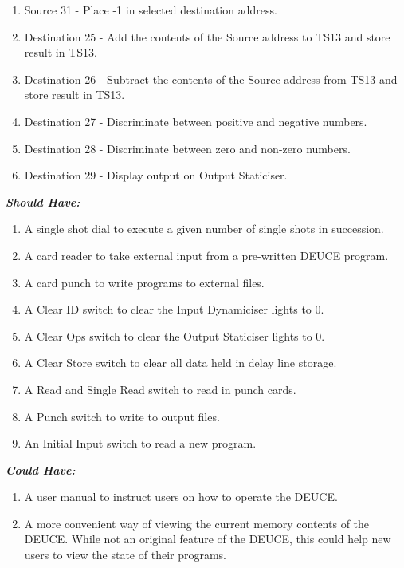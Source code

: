 \documentclass{l4proj}
\begin{document}
\begin{enumerate}
\begin{enumerate}
		\item Source 31 - Place -1 in selected destination address.
		\item Destination 25 - Add the contents of the Source address to TS13 and store result in TS13.
		\item Destination 26 - Subtract the contents of the Source address from TS13 and store result in TS13.
		\item Destination 27 - Discriminate between positive and negative numbers.
		\item Destination 28 - Discriminate between zero and non-zero numbers.
		\item Destination 29 - Display output on Output Staticiser.
		
	\end{enumerate}
\end{enumerate}

\textbf{\textit{Should Have:}}
\begin{enumerate}
	\item A single shot dial to execute a given number of single shots in succession.
	\item A card reader to take external input from a pre-written DEUCE program.
	\item A card punch to write programs to external files.
	\item A Clear ID switch to clear the Input Dynamiciser lights to 0.
	\item A Clear Ops switch to clear the Output Staticiser lights to 0.
	\item A Clear Store switch to clear all data held in delay line storage.
	\item A Read and Single Read switch to read in punch cards.
	\item A Punch switch to write to output files.
	\item An Initial Input switch to read a new program.
	
\end{enumerate}

\textbf{\textit{Could Have:}}
\begin{enumerate}
	\item A user manual to instruct users on how to operate the DEUCE.
	\item A more convenient way of viewing the current memory contents of the DEUCE. While not an original feature of the DEUCE, this could help new users to view the state of their programs.
	
\end{enumerate}
\end{document}
